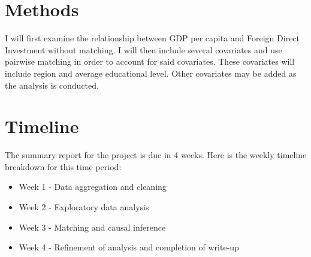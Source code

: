 \documentclass{article}
\begin{document}
\section{Methods}
\quad I will first examine the relationship between GDP per capita and Foreign Direct Investment without matching. I will then include several covariates and use pairwise matching in order to account for said covariates. These covariates will include region and average educational level. Other covariates may be added as the analysis is conducted.
\section{Timeline}
\quad The summary report for the project is due in 4 weeks. Here is the weekly timeline breakdown for this time period:
\begin{itemize}[noitemsep]
    \item Week 1 - Data aggregation and cleaning
    \item Week 2 - Exploratory data analysis
    \item Week 3 - Matching and causal inference
    \item Week 4 - Refinement of analysis and completion of write-up
\end{itemize}
\end{document}
